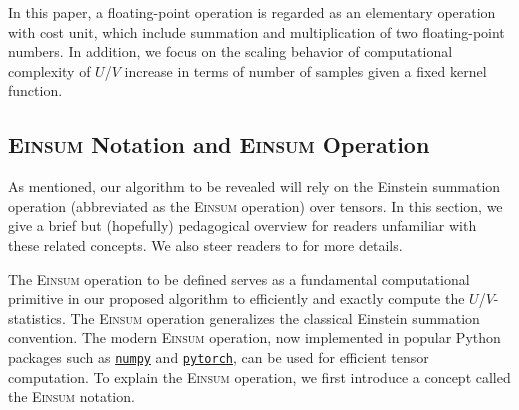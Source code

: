 \documentclass[sn-mathphys, natbib=false]{sn-jnl}
\newcommand{\libref}[2]{\href{#2}{\texttt{#1}}}
\theoremstyle{plain}
\theoremstyle{definition}
\def\Einsum{\textsc{Einsum}}
\newcommand{\numpy}{\libref{numpy}{https://numpy.org/}}
\newcommand{\torch}{\libref{pytorch}{https://pytorch.org/}}
\begin{document}
\begin{bibunit}[agsm]
In this paper, a floating-point operation is regarded as an elementary operation with cost unit, which include summation and multiplication of two floating-point numbers. In addition, we focus on the scaling behavior of computational complexity of $U$/$V$ increase in terms of number of samples given a fixed kernel function.
\fi

\subsection{\Einsum{} Notation and \Einsum{} Operation}
\label{sec:pre_tensor_contraction}

As mentioned, our algorithm to be revealed will rely on the Einstein summation operation (abbreviated as the \Einsum{} operation) over tensors. In this section, we give a brief but (hopefully) pedagogical overview for readers unfamiliar with these related concepts. We also steer readers to \citet{blacher2024einsum} for more details. %

The \Einsum{} operation to be defined serves as a fundamental computational primitive in our proposed algorithm to efficiently and exactly compute the $U$/$V$-statistics. The \Einsum{} operation generalizes the classical Einstein summation convention. The modern \Einsum{} operation, now implemented in popular Python packages such as \numpy{} and \torch{}, can be used for efficient tensor computation. To explain the \Einsum{} operation, we first introduce a concept called the \Einsum{} notation.


\end{bibunit}
\end{document}
